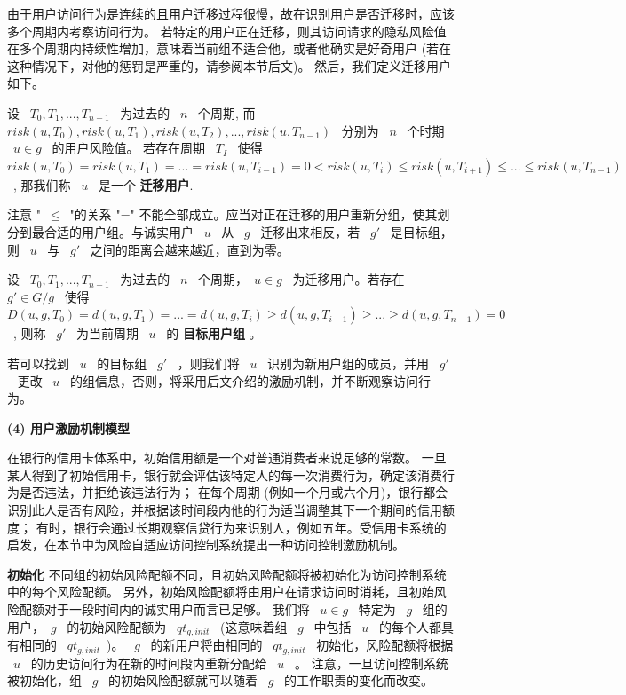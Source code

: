 由于用户访问行为是连续的且用户迁移过程很慢，故在识别用户是否迁移时，应该多个周期内考察访问行为。 若特定的用户正在迁移，则其访问请求的隐私风险值在多个周期内持续性增加，意味着当前组不适合他，或者他确实是好奇用户 (若在这种情况下，对他的惩罚是严重的，请参阅本节后文)。 然后，我们定义迁移用户如下。

\begin{definition}%
	\label{def:migrating user}
	设 ~$T_0,T_1,...,T_{n-1}$~ 为过去的 ~$n$~ 个周期, 而 ~$risk(u,T_0),risk(u,T_1),risk(u,T_2),..., risk(u,T_{n-1})$~ 分别为 ~$n$~ 个时期 ~$u\in g$~ 的用户风险值。 若存在周期 ~$T_I$~ 使得 ~$risk(u,T_0) = risk(u,T_1) = ... = risk(u,T_{i-1}) =0  < risk(u,T_{i}) \leq risk(u,T_{i+1}) \leq ... \leq risk(u,T_{n-1})$~, 那我们称 ~$u$~ 是一个 \textbf{迁移用户}.
\end{definition}

注意 "~$\leq$~"的关系 "=" 不能全部成立。应当对正在迁移的用户重新分组，使其划分到最合适的用户组。与诚实用户 ~$u$~ 从 ~$g$~ 迁移出来相反，若 ~$g'$~ 是目标组，则 ~$u$~ 与 ~$g'$~ 之间的距离会越来越近，直到为零。

\begin{definition}%
	\label{def:target group}
	设 ~$T_0,T_1,...,T_{n-1}$~ 为过去的 ~$n$~ 个周期，~$u \in g$~ 为迁移用户。若存在 ~$g' \in G/g$~ 使得 ~$D(u,g,T_0) = d(u,g,T_1) = ... = d(u,g,T_i) \geq d(u,g,T_{i+1}) \geq ... \geq d(u,g,T_{n-1}) = 0$~, 则称 ~$g'$~ 为当前周期 ~$u$~ 的 \textbf{目标用户组} 。 
\end{definition}

若可以找到 ~$u$~ 的目标组 ~$g'$~ ，则我们将 ~$u$~ 识别为新用户组的成员，并用 ~$g'$~ 更改 ~$u$~ 的组信息，否则，将采用后文介绍的激励机制，并不断观察访问行为。

\textbf{(4) 用户激励机制模型}


在银行的信用卡体系中，初始信用额是一个对普通消费者来说足够的常数。 一旦某人得到了初始信用卡，银行就会评估该特定人的每一次消费行为，确定该消费行为是否违法，并拒绝该违法行为； 在每个周期 (例如一个月或六个月)，银行都会识别此人是否有风险，并根据该时间段内他的行为适当调整其下一个期间的信用额度； 有时，银行会通过长期观察信贷行为来识别人，例如五年。受信用卡系统的启发，在本节中为风险自适应访问控制系统提出一种访问控制激励机制。

\textbf{初始化} 不同组的初始风险配额不同，且初始风险配额将被初始化为访问控制系统中的每个风险配额。 另外，初始风险配额将由用户在请求访问时消耗，且初始风险配额对于一段时间内的诚实用户而言已足够。 我们将 ~$u \in g$~ 特定为 ~$g$~ 组的用户，~$g$~ 的初始风险配额为 ~$qt_{g,init}$~ (这意味着组 ~$g$~ 中包括 ~$u$~ 的每个人都具有相同的 ~$qt_{g,init}$~)。 ~$g$~ 的新用户将由相同的 ~$qt_{g,init}$~ 初始化，风险配额将根据 ~$u$~ 的历史访问行为在新的时间段内重新分配给 ~$u$~ 。 注意，一旦访问控制系统被初始化，组 ~$g$~ 的初始风险配额就可以随着 ~$g$~ 的工作职责的变化而改变。

